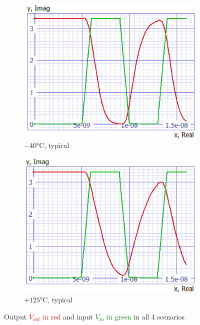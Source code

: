 \documentclass[../main.tex]{subfiles}
\begin{document}
{\begin{figure}[H]
\begin{subfigure}{0.3\textwidth}
				\centering
				\includegraphics[width=\textwidth]{plots/Q8_tp_40.png}
				\caption{$-40$°C, typical}
				\label{fig:subfig3}
			\end{subfigure}
			\begin{subfigure}{0.3\textwidth}
				\centering
				\includegraphics[width=\textwidth]{plots/Q8_tp_125.png}
				\caption{$+125$°C, typical}
				\label{fig:subfig4}
			\end{subfigure}
			
			\caption{Output \textcolor{red}{$V_{out}$ in red} and input \textcolor{green}{$V_{in}$ in green} in all 4 scenarios}
			\label{fig:Q8plots}
		\end{figure}
		
}
\end{document}
